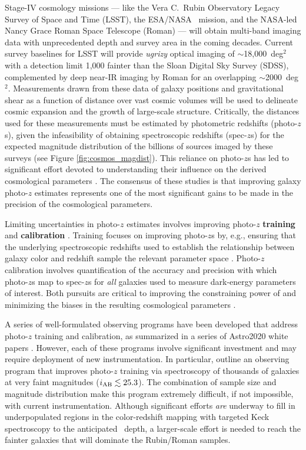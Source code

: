 \documentclass[11pt,a4paper,twoside,onecolumn,openany,final,oldfontcommands]{memoir}
\begin{document}
Stage-IV cosmology missions --- like the Vera C.~Rubin Observatory Legacy Survey of Space and Time (LSST), the ESA/NASA \euclid\ mission, and the NASA-led Nancy Grace Roman Space Telescope (Roman) --- will obtain multi-band imaging data with unprecedented depth and survey area in the coming decades.  Current survey baselines for LSST will provide \textit{ugrizy} optical imaging of $\sim$18,000~deg$^{2}$ with a detection limit 1,000 fainter than the Sloan Digital Sky Survey (SDSS), complemented by deep near-IR imaging by Roman for an overlapping $\sim$2000~deg$^{2}$.  Measurements drawn from these data of galaxy positions and gravitational shear as a function of distance over vast cosmic volumes will be used to delineate cosmic expansion and the growth of large-scale structure. Critically, the distances used for these measurements must be estimated by photometric redshifts (photo-$z$s), given the infeasibility of obtaining spectroscopic redshifts (spec-$z$s) for the expected magnitude distribution of the billions of sources imaged by these surveys (see Figure \ref{fig:cosmos_magdist}).  This reliance on photo-$z$s has led to significant effort devoted to understanding their influence on the derived cosmological parameters \citep{huterer06, hearin10, newman15, LSSTDESCSRD}.  The consensus of these studies is that improving galaxy photo-$z$ estimates represents one of the most significant gains to be made in the precision of the cosmological parameters.

Limiting uncertainties in photo-$z$ estimates involves improving photo-$z$ \textbf{training} and \textbf{calibration} \citep{newman15}.  Training focuses on improving photo-$z$s by, e.g., ensuring that the underlying spectroscopic redshifts used to establish the relationship between galaxy color and redshift sample the relevant parameter space \citep{masters15, hemmati18}.  Photo-$z$ calibration involves quantification of the accuracy and precision with which photo-$z$s map to spec-$z$s for \textit{all} galaxies used to measure dark-energy parameters of interest.  Both pursuits are critical to improving the constraining power of and minimizing the biases in the resulting cosmological parameters \citep{LSSTDESCSRD}.

A series of well-formulated observing programs have been developed that address photo-$z$ training and calibration, as summarized in a series of Astro2020 white papers \citep{newman19, hlovek19, mandelbaum19}.  However, each of these programs involve significant investment and may require deployment of new instrumentation.  In particular, \citet{newman15, newman19} outline an observing program that improves photo-$z$ training via spectroscopy of thousands of galaxies at very faint magnitudes ($i_{\rm AB} \lesssim 25.3$).  The combination of sample size and magnitude distribution make this program extremely difficult, if not impossible, with current instrumentation.  Although significant efforts \textit{are} underway to fill in underpopulated regions in the color-redshift mapping with targeted Keck spectroscopy to the anticipated \euclid\ depth\citep{masters19}, a larger-scale effort is needed to reach the fainter galaxies that will dominate the Rubin/Roman samples.
\end{document}
